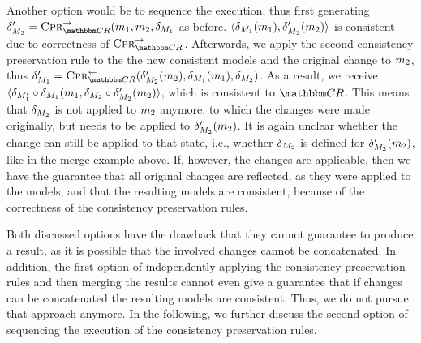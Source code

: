 Another option would be to sequence the execution, thus first generating $\change{\metamodel{M}{2}}' = \consistencypreservationrule{\consistencyrelationset{CR}}^{\rightarrow}(\model{m}{1},\model{m}{2}, \change{\metamodel{M}{1}}$ as before.
$\langle \delta_{M_{1}}(m_{1}), \delta_{M_{2}}'(m_{2}) \rangle$ is consistent due to correctness of $\consistencypreservationrule{\consistencyrelationset{CR}}^{\rightarrow}$.
Afterwards, we apply the second consistency preservation rule to the the new consistent models and the original change to $m_{2}$, thus $\change{\metamodel{M}{1}}' = \consistencypreservationrule{\consistencyrelationset{CR}}^{\leftarrow}(\change{\metamodel{M}{2}}'(\model{m}{2}), \change{\metamodel{M}{1}}(\model{m}{1}), \change{\metamodel{M}{2}})$.
As a result, we receive $\langle \delta_{M_{1}'} \circ \delta_{M_{1}}(m_{1}, \delta_{M_{2}} \circ \delta_{M_{2}}'(m_{2}) \rangle$, which is consistent to $\consistencyrelationset{CR}$.
This means that $\delta_{M_{2}}$ is not applied to $m_{2}$ anymore, to which the changes were made originally, but needs to be applied to $\delta_{M_{2}}'(m_{2})$.
It is again unclear whether the change can still be applied to that state, i.e., whether $\delta_{M_{2}}$ is defined for $\delta_{M_{2}}'(m_{2})$, like in the merge example above.
If, however, the changes are applicable, then we have the guarantee that all original changes are reflected, as they were applied to the models, and that the resulting models are consistent, because of the correctness of the consistency preservation rules.

Both discussed options have the drawback that they cannot guarantee to produce a result, as it is possible that the involved changes cannot be concatenated.
In addition, the first option of independently applying the consistency preservation rules and then merging the results cannot even give a guarantee that if changes can be concatenated the resulting models are consistent.
Thus, we do not pursue that approach anymore.
In the following, we further discuss the second option of sequencing the execution of the consistency preservation rules.

